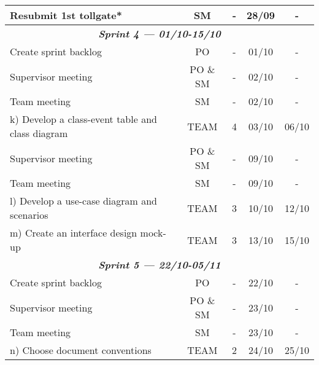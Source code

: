 \begin{longtable}[c]{@{}lcccc@{}}
Resubmit 1st tollgate*                                   & SM                   & -                 & 28/09          & -            \\* \midrule
\multicolumn{5}{c}{\textit{\textbf{Sprint 4 --- 01/10-15/10}}}                                                                         \\
Create sprint backlog                                    & PO                   & -                 & 01/10          & -            \\
Supervisor meeting                                       & PO \& SM             & -                 & 02/10          & -            \\
Team meeting                                             & SM                   & -                 & 02/10          & -            \\
k) Develop a class-event table and class diagram         & TEAM                 & 4                 & 03/10          & 06/10        \\
Supervisor meeting                                       & PO \& SM             & -                 & 09/10          & -            \\
Team meeting                                             & SM                   & -                 & 09/10          & -            \\
l) Develop a use-case diagram and scenarios              & TEAM                 & 3                 & 10/10          & 12/10        \\
m) Create an interface design mock-up                    & TEAM                 & 3                 & 13/10          & 15/10        \\* \midrule
\multicolumn{5}{c}{\textit{\textbf{Sprint 5 --- 22/10-05/11}}}                                                                         \\
Create sprint backlog                                    & PO                   & -                 & 22/10          & -            \\
Supervisor meeting                                       & PO \& SM             & -                 & 23/10          & -            \\
Team meeting                                             & SM                   & -                 & 23/10          & -            \\
n) Choose document conventions                           & TEAM                 & 2                 & 24/10          & 25/10        \\

\end{longtable}
